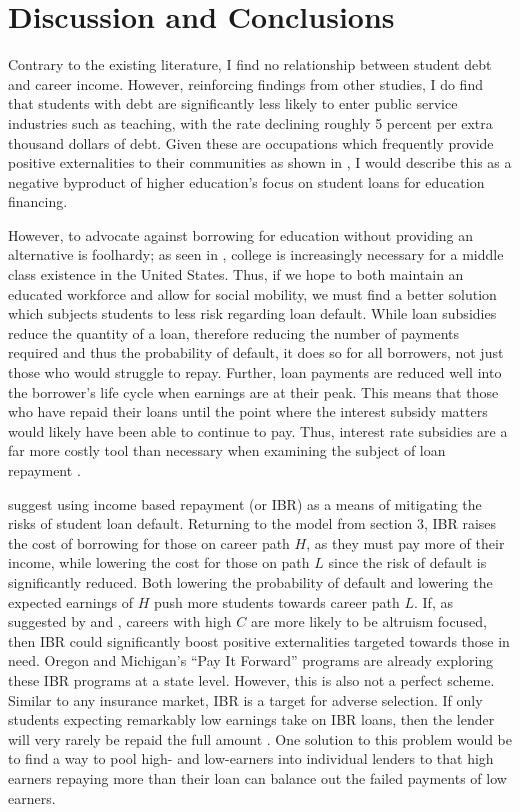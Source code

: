 \documentclass[12pt]{article}
\begin{document}
	\section{Discussion and Conclusions}
	
	Contrary to the existing literature, I find no relationship between student debt and career income. However, reinforcing findings from other studies, I do find that students with debt are significantly less likely to enter public service industries such as teaching, with the rate declining roughly 5 percent per extra thousand dollars of debt. Given these are occupations which frequently provide positive externalities to their communities as shown in \textcite{benshem1991}, I would describe this as a negative byproduct of higher education's focus on student loans for education financing.
	
	However, to advocate against borrowing for education without providing an alternative is foolhardy; as seen in \textcite{abel2014}, college is increasingly necessary for a middle class existence in the United States. Thus, if we hope to both maintain an educated workforce and allow for social mobility, we must find a better solution which subjects students to less risk regarding loan default. While loan subsidies reduce the quantity of a loan, therefore reducing the number of payments required and thus the probability of default, it does so for all borrowers, not just those who would struggle to repay. Further, loan payments are reduced well into the borrower's life cycle when earnings are at their peak. This means that those who have repaid their loans until the point where the interest subsidy matters would likely have been able to continue to pay. Thus, interest rate subsidies are a far more costly tool than necessary when examining the subject of loan repayment \parencite{dynarski2015}.
	
	\textcite{abraham2018} suggest using income based repayment (or IBR) as a means of mitigating the risks of student loan default. Returning to the model from section 3, IBR raises the cost of borrowing for those on career path $H$, as they must pay more of their income, while lowering the cost for those on path $L$ since the risk of default is significantly reduced. Both lowering the probability of default and lowering the expected earnings of $H$ push more students towards career path $L$. If, as suggested by \textcite{benshem1991} and \textcite{hanson1995}, careers with high $C$ are more likely to be altruism focused, then IBR could significantly boost positive externalities targeted towards those in need.  Oregon and Michigan's ``Pay It Forward'' programs are already exploring these IBR programs at a state level. However, this is also not a perfect scheme. Similar to any insurance market, IBR is a target for adverse selection. If only students expecting remarkably low earnings take on IBR loans, then the lender will very rarely be repaid the full amount \parencite{dynarski2015}. One solution to this problem would be to find a way to pool high- and low-earners into individual lenders to that high earners repaying more than their loan can balance out the failed payments of low earners.
	
\end{document}
